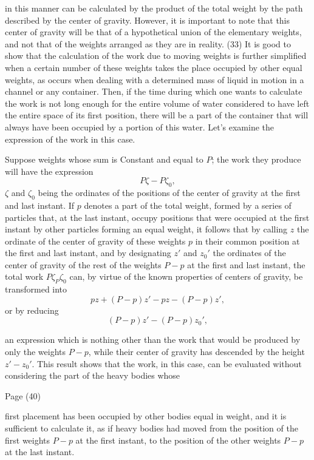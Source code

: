 \documentclass{book}
\begin{document}
\newpage

in this manner can be calculated by the product of the total weight by the path described by the center of gravity. However, it is important to note that this center of gravity will be that of a hypothetical union of the elementary weights, and not that of the weights arranged as they are in reality.
(33)
It is good to show that the calculation of the work due to moving weights is further simplified when a certain number of these weights takes the place occupied by other equal weights, as occurs when dealing with a determined mass of liquid in motion in a channel or any container. Then, if the time during which one wants to calculate the work is not long enough for the entire volume of water considered to have left the entire space of its first position, there will be a part of the container that will always have been occupied by a portion of this water. Let's examine the expression of the work in this case.

Suppose weights whose sum is Constant and equal to \(P\); the work they produce will have the expression \[P\zeta−P\zeta_0,\] \(\zeta\) and \(\zeta_0\) being the ordinates of the positions of the center of gravity at the first and last instant. If \(p\) denotes a part of the total weight, formed by a series of particles that, at the last instant, occupy positions that were occupied at the first instant by other particles forming an equal weight, it follows that by calling \(z\) the ordinate of the center of gravity of these weights \(p\) in their common position at the first and last instant, and by designating \(z'\) and \(z_0'\) the ordinates of the center of gravity of the rest of the weights 
\(P-p\) at the first and last instant, the total work \(P\zeta_P\zeta_0\) can, by virtue of the known properties of centers of gravity, be transformed into
\[pz+(P-p)z'-pz-(P-p)z',\]  
or by reducing
\[(P-p)z'-(P-p)z_0',\]  


an expression which is nothing other than the work that would be produced by only the weights \(P-p\), while their center of gravity has descended by the height \(z'-z_0'\). This result shows that the work, in this case, can be evaluated without considering the part of the heavy bodies whose 

\newpage
Page (40) \\
\begin{comment}
This passage describes the calculation of work in fluid dynamics, particularly with water flow in canals, and introduces the concept of work due to mutual reactions, using the example of repulsive forces in a spring system.
\end{comment}
first placement has been occupied by other bodies equal in weight, and it is sufficient to calculate it, as if heavy bodies had moved from the position of the first weights \(P-p\) at the first instant, to the position of the other weights \(P-p\) at the last instant.
\end{document}
